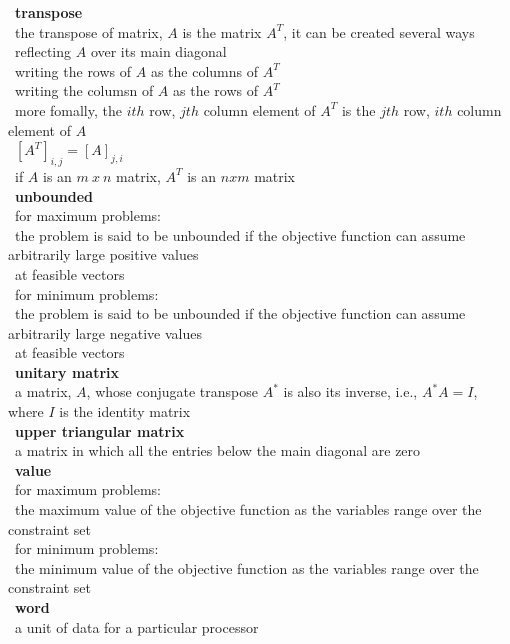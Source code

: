 \documentclass[10pt,letterpaper]{scrartcl}
\newcommand{\tbul}{\textbullet}
\newcommand{\tend}{\>\textendash}
\newcommand{\tasc}{\>\>\textasteriskcentered}
\newcommand{\tpec}{\>\>\>\textperiodcentered}
\begin{document}
\begin{tabbing}
\tbul\ \textbf{transpose} \\
    \tend\ the transpose of matrix, $A$ is the matrix $A^T$, it can be created several ways \\
        \tasc\ reflecting $A$ over its main diagonal \\
        \tasc\ writing the rows of $A$ as the columns of $A^T$ \\
        \tasc\ writing the columsn of $A$ as the rows of $A^T$ \\
        \tasc\ more fomally, the $ith$ row, $jth$ column element of $A^T$ is the $jth$ row, $ith$ column element of $A$ \\
            \tpec\ $[A^T]_{i,j} = [A]_{j,i}$ \\
        \tasc\ if $A$ is an $m\ x\ n$ matrix, $A^T$ is an $nxm$ matrix \\
\tbul\ \textbf{unbounded} \\
    \tend\ for maximum problems: \\
        \tasc\ the problem is said to be unbounded if the objective function can assume arbitrarily large positive values \\ \>\>\ at feasible vectors \\
    \tend\ for minimum problems: \\
        \tasc\ the problem is said to be unbounded if the objective function can assume arbitrarily large negative values \\ \>\>\ at feasible vectors \\
\tbul\ \textbf{unitary matrix} \\
    \tend\ a matrix, $A$, whose conjugate transpose $A^*$ is also its inverse, i.e., $A^*A=I$, where $I$ is the identity matrix \\
\tbul\ \textbf{upper triangular matrix} \\
    \tend\ a matrix in which all the entries below the main diagonal are zero \\
\tbul\ \textbf{value} \\
    \tend\ for maximum problems: \\ 
        \tasc\ the maximum value of the objective function as the variables range over the constraint set \\
    \tend\ for minimum problems: \\
        \tasc\ the minimum value of the objective function as the variables range over the constraint set \\
\tbul\ \textbf{word} \\
    \tend\ a unit of data for a particular processor \\

\end{tabbing}
\end{document}

